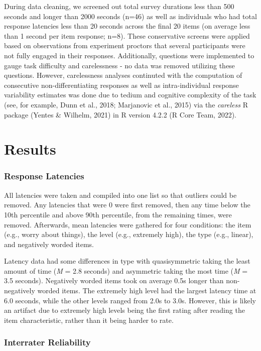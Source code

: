 \documentclass[
  ,jou]{apa6}
\begin{document}
During data cleaning, we screened out total survey durations less than 500 seconds and longer than 2000 seconds (n=46) as well as individuals who had total response latencies less than 20 seconds across the final 20 items (on average less than 1 second per item response; n=8). These conservative screens were applied based on observations from experiment proctors that several participants were not fully engaged in their responses. Additionally, questions were implemented to gauge task difficulty and carelessness - no data was removed utilizing these questions. However, carelessness analyses continuted with the computation of consecutive non-differentiating responses as well as intra-individual response variability estimates was done due to tedium and cognitive complexity of the task (see, for example, Dunn et al., 2018; Marjanovic et al., 2015) via the \emph{careless} R package (Yentes \& Wilhelm, 2021) in R version 4.2.2 (R Core Team, 2022).

\section{Results}\label{results-1}

\subsubsection{Response Latencies}\label{response-latencies}

All latencies were taken and compiled into one list so that outliers could be removed. Any latencies that were 0 were first removed, then any time below the 10th percentile and above 90th percentile, from the remaining times, were removed. Afterwards, mean latencies were gathered for four conditions: the item (e.g., worry about things), the level (e.g., extremely high), the type (e.g., linear), and negatively worded items.

Latency data had some differences in type with quasisymmetric taking the least amount of time (\emph{M} = 2.8 seconds) and asymmetric taking the most time (\emph{M} = 3.5 seconds). Negatively worded items took on average 0.5s longer than non-negatively worded items. The extremely high level had the largest latency time at 6.0 seconds, while the other levels ranged from 2.0s to 3.0s. However, this is likely an artifact due to extremely high levels being the first rating after reading the item characteristic, rather than it being harder to rate.

\subsubsection{Interrater Reliability}\label{interrater-reliability}
\end{document}
